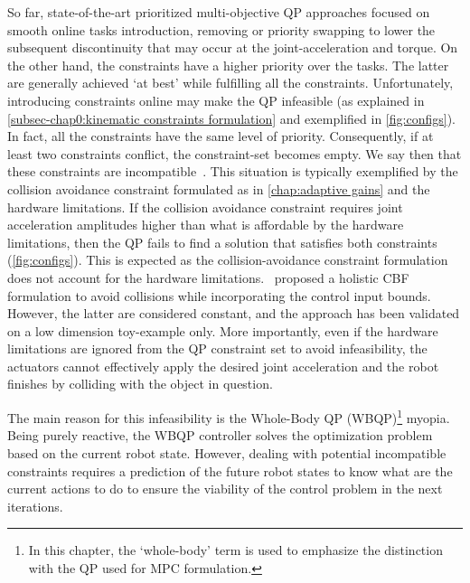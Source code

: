 So far, state-of-the-art prioritized multi-objective QP approaches focused on smooth online tasks introduction, removing or priority swapping to lower the subsequent discontinuity that may occur at the joint-acceleration and torque. On the other hand, the constraints have a higher priority over the tasks. The latter are generally achieved ‘at best’ while fulfilling all the constraints. Unfortunately, introducing constraints online may make the QP infeasible (as explained in \cref{subsec-chap0:kinematic constraints formulation} and exemplified in \cref{fig:configs}). In fact, all the constraints have the same level of priority. Consequently, if at least two constraints conflict, the constraint-set becomes empty. We say then that these constraints are incompatible~\cite{decre2009icra,rubrecht2010iros,delprete2018ral,meguenani2017phdThesis}. This situation is typically exemplified by the collision avoidance constraint formulated as in  \cref{chap:adaptive gains} and the hardware limitations.
If the collision avoidance constraint requires joint acceleration amplitudes higher than what is affordable by the hardware limitations, then the QP fails to find a solution that satisfies both constraints (\cref{fig:configs}).  This is expected as the collision-avoidance constraint formulation does not account for the hardware limitations.~\cite{ames2021csl} proposed a holistic CBF formulation to avoid collisions while incorporating the control input bounds. However, the latter are considered constant, and the approach has been validated on a low dimension toy-example only. More importantly, even if the hardware limitations are ignored from the QP constraint set to avoid infeasibility, the actuators cannot effectively apply the desired joint acceleration and the robot finishes by colliding with the object in question.   

The main reason for this infeasibility is the Whole-Body QP (WBQP)\footnote{In this chapter, the ‘whole-body’ term is used to emphasize the distinction with the QP used for MPC formulation. } myopia. Being purely reactive, the WBQP controller solves the optimization problem based on the current robot state. However, dealing with potential incompatible  constraints requires a prediction of the future robot states  to know what are the current actions to do to ensure the viability of the control problem in the next iterations. 
  
